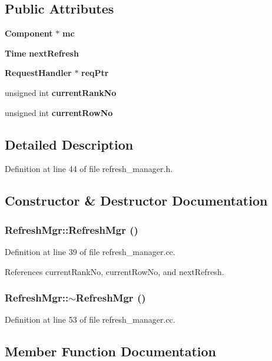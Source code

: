 \subsection*{Public Attributes}
\begin{CompactItemize}
\item 
{\bf Component} $\ast$ {\bf mc}
\item 
{\bf Time} {\bf nextRefresh}
\item 
{\bf RequestHandler} $\ast$ {\bf reqPtr}
\item 
unsigned int {\bf currentRankNo}
\item 
unsigned int {\bf currentRowNo}
\end{CompactItemize}


\subsection{Detailed Description}


Definition at line 44 of file refresh\_\-manager.h.

\subsection{Constructor \& Destructor Documentation}
\subsubsection[{RefreshMgr}]{\setlength{\rightskip}{0pt plus 5cm}RefreshMgr::RefreshMgr ()}\label{classRefreshMgr_5a2c872aa68b6cb67db561a030893ef9}




Definition at line 39 of file refresh\_\-manager.cc.

References currentRankNo, currentRowNo, and nextRefresh.
\subsubsection[{$\sim$RefreshMgr}]{\setlength{\rightskip}{0pt plus 5cm}RefreshMgr::$\sim$RefreshMgr ()}\label{classRefreshMgr_52a8a561efe0357f2961f9a148919136}




Definition at line 53 of file refresh\_\-manager.cc.

\subsection{Member Function Documentation}
